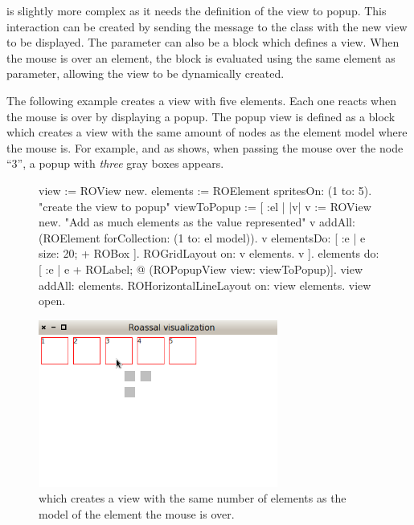 \documentclass[a4paper,10pt,twoside]{book}
\begin{document}
 is slightly more complex as it needs the definition of the view to popup. This interaction can be created by sending the  message to the  class with the new view to be displayed. 
The parameter can also be a block which defines a view. When the mouse is over an element, the block is evaluated using the same element as parameter, allowing the view to be dynamically created.

The following example creates a view with five elements. Each one reacts when the mouse is over by displaying a popup. The popup view is defined as a block which creates a view with the same amount of nodes as the element model where the mouse is. For example, and as  shows, when passing the mouse over the node ``3'', a popup with \textit{three} gray boxes appears.

\begin{figure}[H]
      \begin{minipage}[t]{1\textwidth}
      \vspace{0pt}
     \begin{code}{}
view := ROView new.
elements := ROElement spritesOn: (1 to: 5).
"create the view to popup"
viewToPopup := [ :el | |v| 
	              	              v := ROView new.
	              	              "Add as much elements as the value represented"
	              	              v addAll: (ROElement forCollection: (1 to: el model)).
	              	              v elementsDo: [ :e | e size: 20; + ROBox ].
	              	              ROGridLayout on: v elements.
	              	              v ].
elements do: [ :e | e + ROLabel;  @ (ROPopupView view: viewToPopup)].
view addAll: elements.
ROHorizontalLineLayout on: view elements.
view open.
\end{code}
\end{minipage}\hfill\begin{minipage}[t]{1\textwidth}
	 \vspace{0pt} \raggedright
       \centering
		\includegraphics[width=0.7\textwidth]{popupView2}
   \end{minipage}
\label{fig:popupView}
\caption{ which creates a view with the same number of elements as the model of the element the mouse is over.}
\end{figure} 
\end{document}
